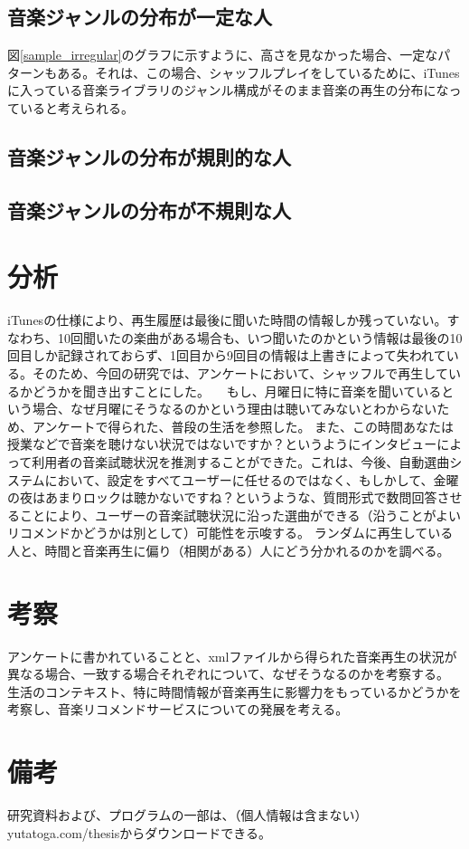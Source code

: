 \documentclass{jsarticle}
\begin{document}
\subsection{音楽ジャンルの分布が一定な人}
図\ref{sample_irregular}のグラフに示すように、高さを見なかった場合、一定なパターンもある。それは、この場合、シャッフルプレイをしているために、iTunesに入っている音楽ライブラリのジャンル構成がそのまま音楽の再生の分布になっていると考えられる。
\subsection{音楽ジャンルの分布が規則的な人}
\subsection{音楽ジャンルの分布が不規則な人}


\section{分析}
iTunesの仕様により、再生履歴は最後に聞いた時間の情報しか残っていない。すなわち、10回聞いたの楽曲がある場合も、いつ聞いたのかという情報は最後の10回目しか記録されておらず、1回目から9回目の情報は上書きによって失われている。そのため、今回の研究では、アンケートにおいて、シャッフルで再生しているかどうかを聞き出すことにした。
　もし、月曜日に特に音楽を聞いているという場合、なぜ月曜にそうなるのかという理由は聴いてみないとわからないため、アンケートで得られた、普段の生活を参照した。
また、この時間あなたは授業などで音楽を聴けない状況ではないですか？というようにインタビューによって利用者の音楽試聴状況を推測することができた。これは、今後、自動選曲システムにおいて、設定をすべてユーザーに任せるのではなく、もしかして、金曜の夜はあまりロックは聴かないですね？というような、質問形式で数問回答させることにより、ユーザーの音楽試聴状況に沿った選曲ができる（沿うことがよいリコメンドかどうかは別として）可能性を示唆する。
ランダムに再生している人と、時間と音楽再生に偏り（相関がある）人にどう分かれるのかを調べる。

\section{考察}
アンケートに書かれていることと、xmlファイルから得られた音楽再生の状況が異なる場合、一致する場合それぞれについて、なぜそうなるのかを考察する。
生活のコンテキスト、特に時間情報が音楽再生に影響力をもっているかどうかを考察し、音楽リコメンドサービスについての発展を考える。

\section{備考}
研究資料および、プログラムの一部は、（個人情報は含まない）
yutatoga.com/thesisからダウンロードできる。
\end{document}
